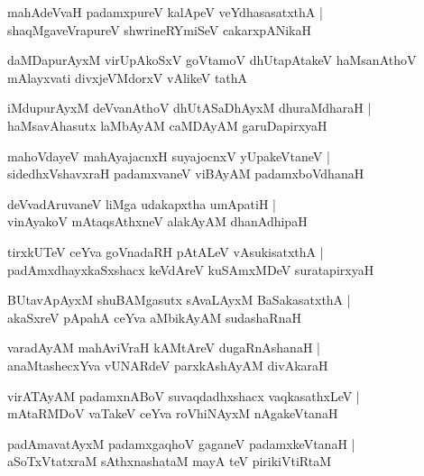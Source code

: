 \begin{shloka}
mahAdeVvaH padamxpureV kalApeV veYdhasasatxthA |\\
shaqMgaveVrapureV shwrineRYmiSeV cakarxpANikaH
\end{shloka}

\begin{shloka}
daMDapurAyxM virUpAkoSxV goVtamoV dhUtapAtakeV
haMsanAthoV mAlayxvati divxjeVMdorxV vAlikeV tathA
\end{shloka}

\begin{shloka}
iMdupurAyxM deVvanAthoV dhUtASaDhAyxM dhuraMdharaH |\\
haMsavAhasutx laMbAyAM caMDAyAM garuDapirxyaH 
\end{shloka}

\begin{shloka}
mahoVdayeV mahAyajacnxH suyajocnxV yUpakeVtaneV |\\
sidedhxVshavxraH padamxvaneV viBAyAM padamxboVdhanaH 
\end{shloka}

\begin{shloka}
deVvadAruvaneV liMga udakapxtha umApatiH |\\
vinAyakoV mAtaqsAthxneV alakAyAM dhanAdhipaH
\end{shloka}

\begin{shloka}
tirxkUTeV ceYva goVnadaRH pAtALeV vAsukisatxthA |\\
padAmxdhayxkaSxshacx keVdAreV kuSAmxMDeV suratapirxyaH
\end{shloka}

\begin{shloka}
BUtavApAyxM shuBAMgasutx sAvaLAyxM BaSakasatxthA |\\
akaSxreV pApahA ceYva aMbikAyAM sudashaRnaH 
\end{shloka}

\begin{shloka}
varadAyAM mahAviVraH kAMtAreV dugaRnAshanaH |\\
anaMtashecxYva vUNARdeV parxkAshAyAM divAkaraH 
\end{shloka}

\begin{shloka}
virATAyAM padamxnABoV suvaqdadhxshacx vaqkasathxLeV |\\
mAtaRMDoV vaTakeV ceYva roVhiNAyxM nAgakeVtanaH 
\end{shloka}

\begin{shloka}
padAmavatAyxM padamxgaqhoV gaganeV padamxkeVtanaH |\\
aSoTxVtatxraM sAthxnashataM mayA teV pirikiVtiRtaM 
\end{shloka}

